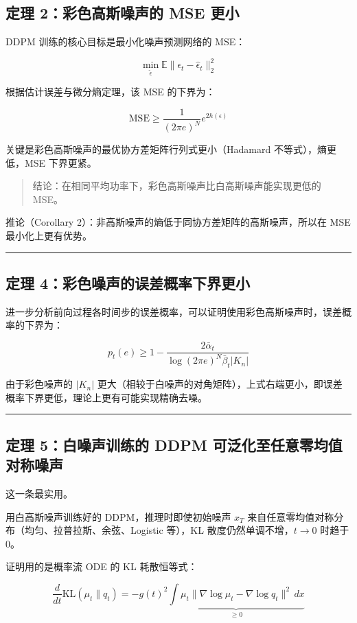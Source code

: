 \subsection{定理 2：彩色高斯噪声的 MSE 更小}

DDPM 训练的核心目标是最小化噪声预测网络的 MSE：

\[
\min_{\hat{\epsilon}} \mathbb{E} \|\epsilon_t - \hat{\epsilon}_t\|_2^2
\]

根据估计误差与微分熵定理，该 MSE 的下界为：

\[
\text{MSE} \geq \frac{1}{(2\pi e)^N} e^{2h(\epsilon)}
\]

关键是彩色高斯噪声的最优协方差矩阵行列式更小（Hadamard 不等式），熵更低，MSE 下界更紧。

\begin{quote}
结论：在相同平均功率下，彩色高斯噪声比白高斯噪声能实现更低的 MSE。
\end{quote}

推论（Corollary 2）：非高斯噪声的熵低于同协方差矩阵的高斯噪声，所以在 MSE 最小化上更有优势。

\hrule

\subsection{定理 4：彩色噪声的误差概率下界更小}

进一步分析前向过程各时间步的误差概率，可以证明使用彩色高斯噪声时，误差概率的下界为：

\[
p_t(e) \geq 1 - \frac{2\bar{\alpha}_t}{\log(2\pi e)^N \bar{\beta}_t |K_n|}
\]

由于彩色噪声的 \(|K_n|\) 更大（相较于白噪声的对角矩阵），上式右端更小，即误差概率下界更低，理论上更有可能实现精确去噪。

\hrule

\subsection{定理 5：白噪声训练的 DDPM 可泛化至任意零均值对称噪声}

这一条最实用。

用白高斯噪声训练好的 DDPM，推理时即使初始噪声 \(x_T\) 来自任意零均值对称分布（均匀、拉普拉斯、余弦、Logistic 等），KL 散度仍然单调不增，\(t \to 0\) 时趋于 0。

证明用的是概率流 ODE 的 KL 耗散恒等式：

\[
\frac{d}{dt} \text{KL}(\mu_t \| q_t) = -g(t)^2 \underbrace{\int \mu_t \|\nabla \log \mu_t - \nabla \log q_t\|^2 \, dx}_{\geq 0}
\]

